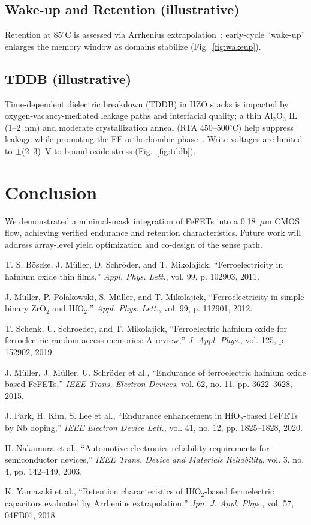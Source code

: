 \documentclass[conference]{IEEEtran}
\begin{document}
\subsection{Wake-up and Retention (illustrative)}
Retention at 85$^\circ$C is assessed via Arrhenius extrapolation~\cite{Yamazaki2018}; early-cycle “wake-up” enlarges the memory window as domains stabilize (Fig.~\ref{fig:wakeup}).

\subsection{TDDB (illustrative)}
Time-dependent dielectric breakdown (TDDB) in HZO stacks is impacted by oxygen-vacancy-mediated leakage paths and interfacial quality; a thin Al$_2$O$_3$ IL (1--2~nm) and moderate crystallization anneal (RTA 450--500$^\circ$C) help suppress leakage while promoting the FE orthorhombic phase~\cite{Mueller2015,Park2020}. Write voltages are limited to $\pm$(2--3)~V to bound oxide stress (Fig.~\ref{fig:tddb}).

\section{Conclusion}
We demonstrated a minimal-mask integration of FeFETs into a 0.18~$\mu$m CMOS flow, achieving verified endurance and retention characteristics. Future work will address array-level yield optimization and co-design of the sense path.

\begin{thebibliography}{8}
T. S. B\"oscke, J. M\"uller, D. Schr\"oder, and T. Mikolajick, ``Ferroelectricity in hafnium oxide thin films,'' \emph{Appl. Phys. Lett.}, vol. 99, p. 102903, 2011.

J. M\"uller, P. Polakowski, S. M\"uller, and T. Mikolajick, ``Ferroelectricity in simple binary ZrO$_2$ and HfO$_2$,'' \emph{Appl. Phys. Lett.}, vol. 99, p. 112901, 2012.

T. Schenk, U. Schroeder, and T. Mikolajick, ``Ferroelectric hafnium oxide for ferroelectric random-access memories: A review,'' \emph{J. Appl. Phys.}, vol. 125, p. 152902, 2019.

J. M\"uller, J. M\"uller, U. Schr\"oder et al., ``Endurance of ferroelectric hafnium oxide based FeFETs,'' \emph{IEEE Trans. Electron Devices}, vol. 62, no. 11, pp. 3622--3628, 2015.

J. Park, H. Kim, S. Lee et al., ``Endurance enhancement in HfO$_2$-based FeFETs by Nb doping,'' \emph{IEEE Electron Device Lett.}, vol. 41, no. 12, pp. 1825--1828, 2020.

H. Nakamura et al., ``Automotive electronics reliability requirements for semiconductor devices,'' \emph{IEEE Trans. Device and Materials Reliability}, vol. 3, no. 4, pp. 142--149, 2003.

K. Yamazaki et al., ``Retention characteristics of HfO$_2$-based ferroelectric capacitors evaluated by Arrhenius extrapolation,'' \emph{Jpn. J. Appl. Phys.}, vol. 57, 04FB01, 2018.
\end{thebibliography}
\end{document}
